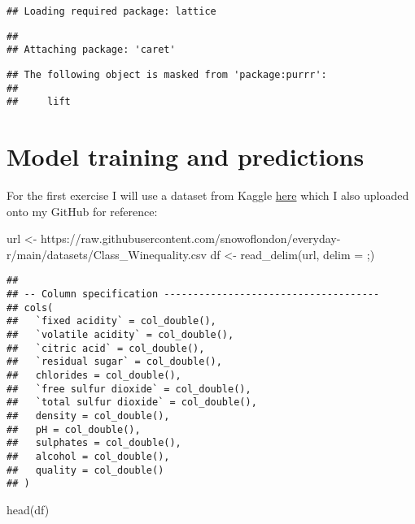 \documentclass[
]{book}
\newenvironment{Shaded}{\begin{snugshade}}{\end{snugshade}}
\newcommand{\AttributeTok}[1]{\textcolor[rgb]{0.77,0.63,0.00}{#1}}
\newcommand{\FunctionTok}[1]{\textcolor[rgb]{0.00,0.00,0.00}{#1}}
\newcommand{\NormalTok}[1]{#1}
\newcommand{\OtherTok}[1]{\textcolor[rgb]{0.56,0.35,0.01}{#1}}
\newcommand{\StringTok}[1]{\textcolor[rgb]{0.31,0.60,0.02}{#1}}
\begin{document}
\begin{verbatim}
## Loading required package: lattice
\end{verbatim}

\begin{verbatim}
## 
## Attaching package: 'caret'
\end{verbatim}

\begin{verbatim}
## The following object is masked from 'package:purrr':
## 
##     lift
\end{verbatim}

\hypertarget{model-training-and-predictions}{%
\section{Model training and predictions}\label{model-training-and-predictions}}

For the first exercise I will use a dataset from Kaggle \href{https://www.kaggle.com/datasets/kkhandekar/all-datasets-for-practicing-ml}{here} which I also uploaded onto my GitHub for reference:

\begin{Shaded}
\begin{Highlighting}[]
\NormalTok{url }\OtherTok{\textless{}{-}} \StringTok{\textquotesingle{}https://raw.githubusercontent.com/snowoflondon/everyday{-}r/main/datasets/Class\_Winequality.csv\textquotesingle{}}
\NormalTok{df }\OtherTok{\textless{}{-}} \FunctionTok{read\_delim}\NormalTok{(url, }\AttributeTok{delim =} \StringTok{\textquotesingle{};\textquotesingle{}}\NormalTok{)}
\end{Highlighting}
\end{Shaded}

\begin{verbatim}
## 
## -- Column specification -------------------------------------
## cols(
##   `fixed acidity` = col_double(),
##   `volatile acidity` = col_double(),
##   `citric acid` = col_double(),
##   `residual sugar` = col_double(),
##   chlorides = col_double(),
##   `free sulfur dioxide` = col_double(),
##   `total sulfur dioxide` = col_double(),
##   density = col_double(),
##   pH = col_double(),
##   sulphates = col_double(),
##   alcohol = col_double(),
##   quality = col_double()
## )
\end{verbatim}

\begin{Shaded}
\begin{Highlighting}[]
\FunctionTok{head}\NormalTok{(df)}
\end{Highlighting}
\end{Shaded}
\end{document}
